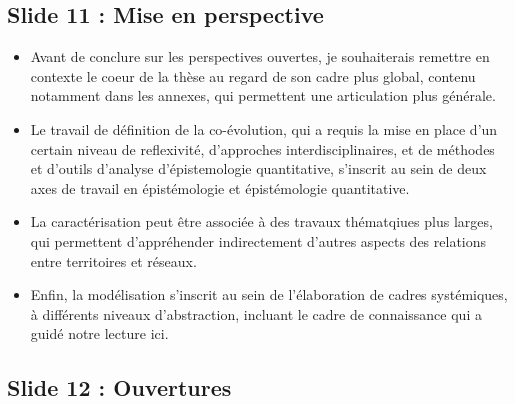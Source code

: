 \documentclass[11pt]{article}
\begin{document}
\subsection*{Slide 11 : Mise en perspective}

\begin{itemize}
	\item Avant de conclure sur les perspectives ouvertes, je souhaiterais remettre en contexte le coeur de la thèse au regard de son cadre plus global, contenu notamment dans les annexes, qui permettent une articulation plus générale.
	\item Le travail de définition de la co-évolution, qui a requis la mise en place d'un certain niveau de reflexivité, d'approches interdisciplinaires, et de méthodes et d'outils d'analyse d'épistemologie quantitative, s'inscrit au sein de deux axes de travail en épistémologie et épistémologie quantitative.
	\item La caractérisation peut être associée à des travaux thématqiues plus larges, qui permettent d'appréhender indirectement d'autres aspects des relations entre territoires et réseaux.
	\item Enfin, la modélisation s'inscrit au sein de l'élaboration de cadres systémiques, à différents niveaux d'abstraction, incluant le cadre de connaissance qui a guidé notre lecture ici.
\end{itemize}


\subsection*{Slide 12 : Ouvertures}
\end{document}
